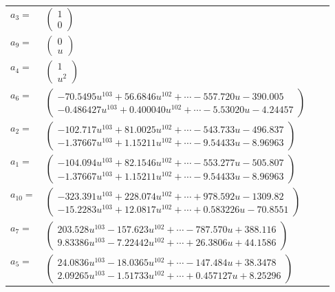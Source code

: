 \documentclass[1p]{elsarticle_modified}
\theoremstyle{definition}
\begin{document}
\begin{tabular}{m{7pt} m{180pt} m{7pt} m{180pt} }
\flushright $a_{3}=$&$\begin{pmatrix}1\\0\end{pmatrix}$ \\
\flushright $a_{9}=$&$\begin{pmatrix}0\\u\end{pmatrix}$ \\
\flushright $a_{4}=$&$\begin{pmatrix}1\\u^2\end{pmatrix}$ \\
\flushright $a_{6}=$&$\begin{pmatrix}-70.5495 u^{103}+56.6846 u^{102}+\cdots-557.720 u-390.005\\-0.486427 u^{103}+0.400040 u^{102}+\cdots-5.53020 u-4.24457\end{pmatrix}$ \\
\flushright $a_{2}=$&$\begin{pmatrix}-102.717 u^{103}+81.0025 u^{102}+\cdots-543.733 u-496.837\\-1.37667 u^{103}+1.15211 u^{102}+\cdots-9.54433 u-8.96963\end{pmatrix}$ \\
\flushright $a_{1}=$&$\begin{pmatrix}-104.094 u^{103}+82.1546 u^{102}+\cdots-553.277 u-505.807\\-1.37667 u^{103}+1.15211 u^{102}+\cdots-9.54433 u-8.96963\end{pmatrix}$ \\
\flushright $a_{10}=$&$\begin{pmatrix}-323.391 u^{103}+228.074 u^{102}+\cdots+978.592 u-1309.82\\-15.2283 u^{103}+12.0817 u^{102}+\cdots+0.583226 u-70.8551\end{pmatrix}$ \\
\flushright $a_{7}=$&$\begin{pmatrix}203.528 u^{103}-157.623 u^{102}+\cdots-787.570 u+388.116\\9.83386 u^{103}-7.22442 u^{102}+\cdots+26.3806 u+44.1586\end{pmatrix}$ \\
\flushright $a_{5}=$&$\begin{pmatrix}24.0836 u^{103}-18.0365 u^{102}+\cdots-147.484 u+38.3478\\2.09265 u^{103}-1.51733 u^{102}+\cdots+0.457127 u+8.25296\end{pmatrix}$ \\

\end{tabular}
\end{document}
